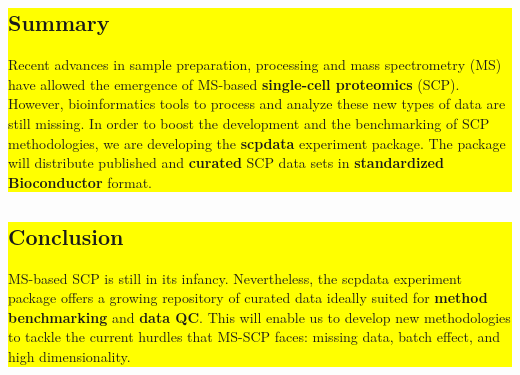 \documentclass{article}
\newcommand{\hcode}[2][lgray]{{\ttfamily\color{vdgray}\colorbox{#1}{#2}}}
\begin{document}
\noindent
\colorbox{yellow}{
  \noindent
  \begin{minipage}[t]{13.7cm}
  \vspace{.15cm}
    \section*{\huge Summary}
    \large 
    Recent advances in sample preparation, processing and mass spectrometry (MS) have allowed the emergence of MS-based \textbf{single-cell proteomics} (SCP). However, bioinformatics tools to process and analyze these new types of data are still missing. In order to boost the development and the benchmarking of SCP methodologies, we are developing the \textbf{\hcode[yellow]{scpdata}} experiment package. The package will distribute published and \textbf{curated} SCP data sets in \textbf{standardized Bioconductor} format.
    \vspace{0.1cm}
  \end{minipage}
}
\hspace{0.37cm}
\noindent
\colorbox{yellow}{
  \begin{minipage}[t]{13.6cm}
    \vspace{.2cm}
    \section*{\huge Conclusion}
    \vspace{0.35cm}
    \large
    MS-based SCP is still in its infancy. Nevertheless, the \hcode[yellow]{scpdata} experiment package offers a growing repository of curated data ideally suited for \textbf{method benchmarking} and \textbf{data QC}. This will enable us to develop new methodologies to tackle the current hurdles that MS-SCP faces: missing data, batch effect, and high dimensionality. 
    \vspace{0.57cm}
 \end{minipage}
}
\vspace{-1cm}
\end{document}
